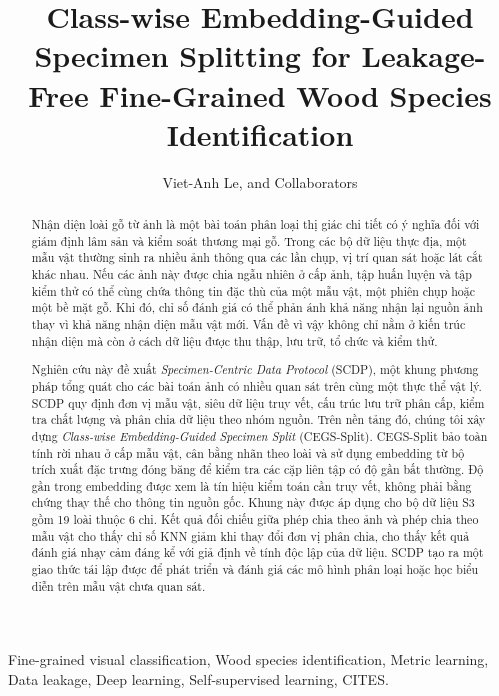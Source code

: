 \documentclass[journal,twocolumn]{IEEEtran}
\begin{document}
\title{Class-wise Embedding-Guided Specimen Splitting for Leakage-Free Fine-Grained Wood Species Identification}

\author{Viet-Anh Le, and Collaborators}

\maketitle

\begin{abstract}
Nhận diện loài gỗ từ ảnh là một bài toán phân loại thị giác chi tiết có ý nghĩa đối với giám định lâm sản và kiểm soát thương mại gỗ. Trong các bộ dữ liệu thực địa, một mẫu vật thường sinh ra nhiều ảnh thông qua các lần chụp, vị trí quan sát hoặc lát cắt khác nhau. Nếu các ảnh này được chia ngẫu nhiên ở cấp ảnh, tập huấn luyện và tập kiểm thử có thể cùng chứa thông tin đặc thù của một mẫu vật, một phiên chụp hoặc một bề mặt gỗ. Khi đó, chỉ số đánh giá có thể phản ánh khả năng nhận lại nguồn ảnh thay vì khả năng nhận diện mẫu vật mới. Vấn đề vì vậy không chỉ nằm ở kiến trúc nhận diện mà còn ở cách dữ liệu được thu thập, lưu trữ, tổ chức và kiểm thử.

Nghiên cứu này đề xuất \emph{Specimen-Centric Data Protocol} (SCDP), một khung phương pháp tổng quát cho các bài toán ảnh có nhiều quan sát trên cùng một thực thể vật lý. SCDP quy định đơn vị mẫu vật, siêu dữ liệu truy vết, cấu trúc lưu trữ phân cấp, kiểm tra chất lượng và phân chia dữ liệu theo nhóm nguồn. Trên nền tảng đó, chúng tôi xây dựng \emph{Class-wise Embedding-Guided Specimen Split} (CEGS-Split). CEGS-Split bảo toàn tính rời nhau ở cấp mẫu vật, cân bằng nhãn theo loài và sử dụng embedding từ bộ trích xuất đặc trưng đóng băng để kiểm tra các cặp liên tập có độ gần bất thường. Độ gần trong embedding được xem là tín hiệu kiểm toán cần truy vết, không phải bằng chứng thay thế cho thông tin nguồn gốc. Khung này được áp dụng cho bộ dữ liệu S3 gồm 19 loài thuộc 6 chi. Kết quả đối chiếu giữa phép chia theo ảnh và phép chia theo mẫu vật cho thấy chỉ số KNN giảm khi thay đổi đơn vị phân chia, cho thấy kết quả đánh giá nhạy cảm đáng kể với giả định về tính độc lập của dữ liệu. SCDP tạo ra một giao thức tái lập được để phát triển và đánh giá các mô hình phân loại hoặc học biểu diễn trên mẫu vật chưa quan sát.
\end{abstract}

\begin{IEEEkeywords}
Fine-grained visual classification, Wood species identification, Metric learning, Data leakage, Deep learning, Self-supervised learning, CITES.
\end{IEEEkeywords}









\end{document}
